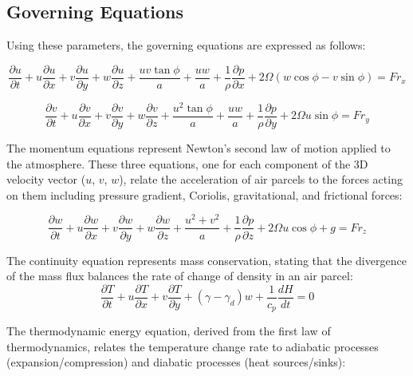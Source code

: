 \documentclass{article}
\begin{document}
\subsection{Governing Equations}
Using these parameters, the governing equations are expressed as follows:


\begin{equation}
\frac{\partial u}{\partial t} + u\frac{\partial u}{\partial x} + v\frac{\partial u}{\partial y} + w\frac{\partial u}{\partial z} + \frac{uv\tan\phi}{a} + \frac{uw}{a} + \frac{1}{\rho}\frac{\partial p}{\partial x} + 2\Omega(w\cos\phi - v\sin\phi) = Fr_x
\label{eq:1}
\end{equation}



\begin{equation}
\frac{\partial v}{\partial t} + u\frac{\partial v}{\partial x} + v\frac{\partial v}{\partial y} + w\frac{\partial v}{\partial z} + \frac{u^2\tan\phi}{a} + \frac{uw}{a} + \frac{1}{\rho}\frac{\partial p}{\partial y} + 2\Omega u\sin\phi = Fr_y
\label{eq:2}
\end{equation}

The momentum equations represent Newton's second law of motion applied to the atmosphere. These three equations, one for each component of the 3D velocity vector ($u$, $v$, $w$), relate the acceleration of air parcels to the forces acting on them including pressure gradient, Coriolis, gravitational, and frictional forces:

\begin{equation}
\frac{\partial w}{\partial t} + u\frac{\partial w}{\partial x} + v\frac{\partial w}{\partial y} + w\frac{\partial w}{\partial z} + \frac{u^2 + v^2}{a} + \frac{1}{\rho}\frac{\partial p}{\partial z} + 2\Omega u\cos\phi + g = Fr_z
\label{eq:3}
\end{equation}

The continuity equation represents mass conservation, stating that the divergence of the mass flux balances the rate of change of density in an air parcel:
\begin{equation}
\frac{\partial T}{\partial t} + u\frac{\partial T}{\partial x} + v\frac{\partial T}{\partial y} + (\gamma - \gamma_d)w + \frac{1}{c_p}\frac{dH}{dt} = 0
\label{eq:4}
\end{equation}

The thermodynamic energy equation, derived from the first law of thermodynamics, relates the temperature change rate to adiabatic processes (expansion/compression) and diabatic processes (heat sources/sinks):
\end{document}
